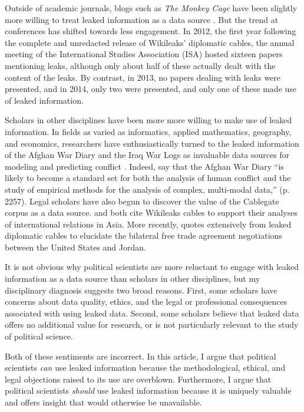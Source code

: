 \documentclass[12pt]{article}
\begin{document}
Outside of academic journals, blogs such as \textit{The Monkey Cage} have been slightly more willing 
to treat leaked information as a data source \citep{voeten2010wikileaks,michael2013united}.
But the trend at conferences has shifted towards less engagement. In 2012, the first year following the 
complete and unredacted release of Wikileaks' diplomatic cables, the annual meeting of the International Studies 
Association (ISA) hosted sixteen papers mentioning leaks, although only about half of these actually dealt 
with the content of the leaks. By contrast, in 2013, no papers dealing with leaks were presented, and in 2014, 
only two were presented, and only one of these made use of leaked information.

Scholars in other disciplines have been more more willing to make use of leaked information. 
In fields as varied as informatics, applied mathematics, geography, and economics, researchers have 
enthusiastically turned to the leaked information of the Afghan War Diary and the Iraq War Logs 
as invaluable data sources for modeling and predicting conflict \citep{linke2012space-time,zammit-mangion2012point,cseke2013sparse,rusch2013model,
zammit-mangion2013modeling}.
Indeed, \citet{dedeo2013bootstrap} say that the Afghan War Diary ``is likely to become 
a standard set for both the analysis of human conflict and the study of empirical methods for the 
analysis of complex, multi-modal data,'' (p. 2257). Legal scholars have also begun to discover 
the value of the Cablegate corpus as a data source. \citet{khoo2011what} and \citet{mendis2012destiny} 
both cite Wikileaks cables to support their analyses of international relations in Asia. 
More recently, \citet{el_said2012morning} quotes extensively from 
leaked diplomatic cables to elucidate the bilateral free trade agreement negotiations between the United States 
and Jordan. 

It is not obvious why political scientists are more reluctant to engage with 
leaked information as a data source than scholars in other disciplines, but my disciplinary 
diagnosis suggests two broad reasons. First, some scholars have concerns about data quality, 
ethics, and the legal or professional consequences associated with using leaked data. 
Second, some scholars believe that leaked data offers no additional value for research, 
or is not particularly relevant to the study of political science.

Both of these sentiments are incorrect. 
In this article, I argue that political scientists \emph{can} use leaked information because 
the methodological, ethical, and legal objections raised to its use are overblown. 
Furthermore, I argue that political scientists \emph{should} use leaked information because it 
is uniquely valuable and offers insight that would otherwise be unavailable.
\end{document}
